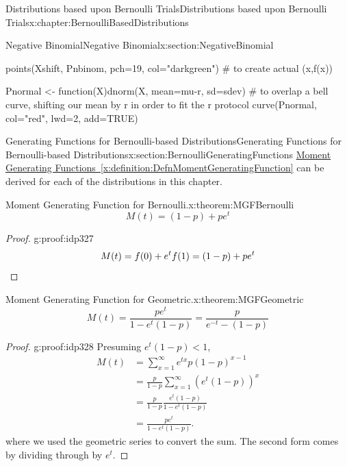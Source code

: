\documentclass[oneside,10pt,]{book}
\newcommand{\xreffont}{\relax}
\newcommand{\qedhere}{\relax}
\numberwithin{equation}{section}
\newcommand{\lt}{<}
\begin{document}
\begin{chapterptx}{Distributions based upon Bernoulli Trials}{}{Distributions based upon Bernoulli Trials}{}{}{x:chapter:BernoulliBasedDistributions}
\begin{sectionptx}{Negative Binomial}{}{Negative Binomial}{}{}{x:section:NegativeBinomial}
\begin{sageinput}
points(Xshift, Pnbinom, pch=19, col="darkgreen")  # to create actual (x,f(x))

Pnormal <- function(X){dnorm(X, mean=mu-r, sd=sdev)}   
# to overlap a bell curve, shifting our mean by r in order to fit the r protocol
curve(Pnormal, col="red", lwd=2, add=TRUE)
\end{sageinput}
%
\end{sectionptx}
%
%
\typeout{************************************************}
\typeout{************************************************}
%
\begin{sectionptx}{Generating Functions for Bernoulli-based Distributions}{}{Generating Functions for Bernoulli-based Distributions}{}{}{x:section:BernoulliGeneratingFunctions}
\hyperref[x:definition:DefnMomentGeneratingFunction]{Moment Generating Functions~{\xreffont\ref{x:definition:DefnMomentGeneratingFunction}}} can be derived for each of the distributions in this chapter.%
\begin{theorem}{Moment Generating Function for Bernoulli.}{}{x:theorem:MGFBernoulli}%
%
\begin{equation*}
M(t) = (1-p) + p e^t
\end{equation*}
%
\end{theorem}
\begin{proof}{}{g:proof:idp327}
%
\begin{equation*}
M(t) = f(0) + e^t f(1) = (1-p) + p e^t\qedhere
\end{equation*}
%
\end{proof}
\begin{theorem}{Moment Generating Function for Geometric.}{}{x:theorem:MGFGeometric}%
%
\begin{equation*}
M(t) = \frac{p e^t }{1 - e^t (1-p)} = \frac{p}{e^{-t} - (1-p)}
\end{equation*}
%
\end{theorem}
\begin{proof}{}{g:proof:idp328}
Presuming \(e^t (1-p) \lt 1\),%
\begin{align*}
M(t) & = \sum_{x=1}^{\infty} e^{tx} p (1-p)^{x-1}\\
& = \frac{p}{1-p} \sum_{x=1}^{\infty} (e^t (1-p))^x\\
& = \frac{p}{1-p} \frac{e^t (1-p)}{1 - e^t (1-p)}\\
& = \frac{pe^t }{1 - e^t (1-p)}.
\end{align*}
where we used the geometric series to convert the sum.  The second form comes by dividing through by \(e^t\).%

\end{proof}
\end{sectionptx}
\end{chapterptx}
\end{document}
